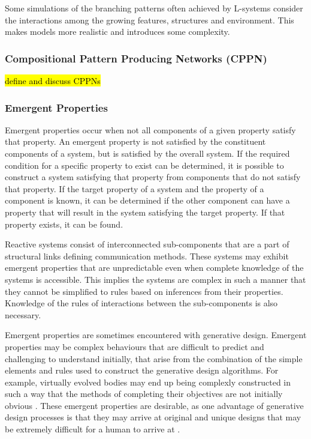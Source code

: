 Some simulations of the branching patterns often achieved by L-systems consider the interactions among the growing features, structures and environment. This makes models more realistic and introduces some complexity. \cite{Prusinkiewicz2004}

\subsubsection{Compositional Pattern Producing Networks (CPPN)}

\hl{define and discuss CPPNs}

\subsubsection{Emergent Properties}

Emergent properties occur when not all components of a given property satisfy that property. An emergent property is not satisfied by the constituent components of a system, but is satisfied by the overall system. If the required condition for a specific property to exist can be determined, it is possible to construct a system satisfying that property from components that do not satisfy that property. If the target property of a system and the property of a component is known, it can be determined if the other component can have a property that will result in the system satisfying the target property. If that property exists, it can be found. \cite{Zakinthinos1998}

Reactive systems consist of interconnected sub-components that are a part of structural links defining communication methods. These systems may exhibit emergent properties that are unpredictable even when complete knowledge of the systems is accessible. This implies the systems are complex in such a manner that they cannot be simplified to rules based on inferences from their properties. Knowledge of the rules of interactions between the sub-components is also necessary. \cite{Aiguier2008}

Emergent properties are sometimes encountered with generative design. Emergent properties may be complex behaviours that are difficult to predict \cite{Aiguier2008} and challenging to understand initially, that arise from the combination of the simple elements and rules used to construct the generative design algorithms. For example, virtually evolved bodies may end up being complexly constructed in such a way that the methods of completing their objectives are not initially obvious \cite{Damper2000}. These emergent properties are desirable, as one advantage of generative design processes is that they may arrive at original and unique designs that may be extremely difficult for a human to arrive at \cite{Sims1994a}.

